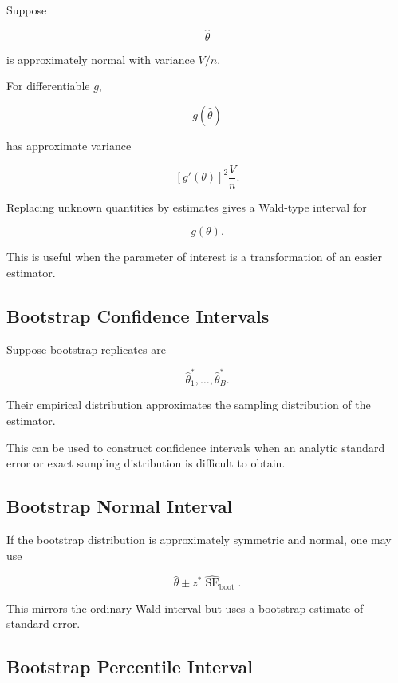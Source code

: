 Suppose

\[
\widehat{\theta}
\]

is approximately normal with variance \(V/n\).

For differentiable \(g\),

\[
g(\widehat{\theta})
\]

has approximate variance

\[
\boxed{
[g'(\theta)]^2
\frac{V}{n}.
}
\]

Replacing unknown quantities by estimates gives a Wald-type interval for

\[
g(\theta).
\]

This is useful when the parameter of interest is a transformation of an
easier estimator.

\subsection{Bootstrap Confidence Intervals}
\label{subsec:bootstrap-confidence-intervals}

Suppose bootstrap replicates are

\[
\widehat{\theta}_1^*,
\ldots,
\widehat{\theta}_B^*.
\]

Their empirical distribution approximates the sampling distribution of
the estimator.

This can be used to construct confidence intervals when an analytic
standard error or exact sampling distribution is difficult to obtain.

\subsection{Bootstrap Normal Interval}
\label{subsec:bootstrap-normal-interval}

If the bootstrap distribution is approximately symmetric and normal,
one may use

\[
\boxed{
\widehat{\theta}
\pm
z^*
\widehat{\operatorname{SE}}_{\text{boot}}.
}
\]

This mirrors the ordinary Wald interval but uses a bootstrap estimate of
standard error.

\subsection{Bootstrap Percentile Interval}
\label{subsec:bootstrap-percentile-interval}

